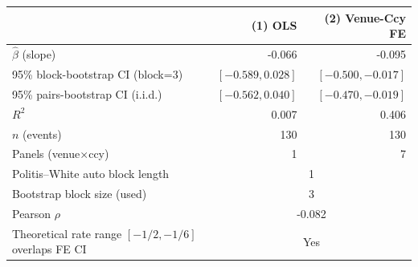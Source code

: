 \begin{tabular}{@{}lrr@{}}
\toprule
 & (1) OLS & (2) Venue-Ccy FE \\
\midrule
$\hat\beta$ (slope) & -0.066 & -0.095 \\
95\% block-bootstrap CI (block=3) & $[-0.589, 0.028]$ & $[-0.500, -0.017]$ \\
95\% pairs-bootstrap CI (i.i.d.) & $[-0.562, 0.040]$ & $[-0.470, -0.019]$ \\
$R^{2}$ & 0.007 & 0.406 \\
\midrule
$n$ (events) & 130 & 130 \\
Panels (venue$\times$ccy) & 1 & 7 \\
Politis--White auto block length & \multicolumn{2}{c}{1} \\
Bootstrap block size (used) & \multicolumn{2}{c}{3} \\
Pearson $\rho$ & \multicolumn{2}{c}{-0.082} \\
Theoretical rate range $[-1/2, -1/6]$ overlaps FE CI & \multicolumn{2}{c}{Yes} \\
\bottomrule
\end{tabular}